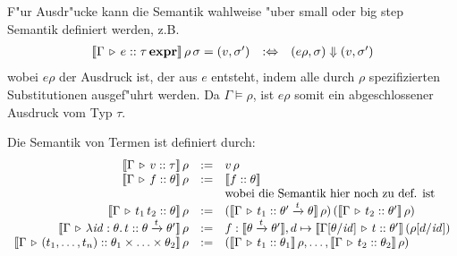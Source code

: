 \documentclass[12pt,a4paper,bigheadings]{scrartcl}
\newcommand{\semantic}[1]{\ensuremath{\llbracket#1\rrbracket}}
\newcommand{\bexpr}{\ensuremath{\mathbf{expr}}}
\newcommand{\etype}[1]{#1\,\bexpr}
\newcommand{\tto}{\ensuremath{\xrightarrow{t}}}
\begin{document}
\noindent
F"ur Ausdr"ucke kann die Semantik wahlweise "uber small oder big step Semantik definiert
werden, z.B.
\[\begin{array}{rcl}
  \semantic{\Tj{\Gamma}{e}{\etype{\tau}}}\,\rho\,\sigma = (v,\sigma')
  & :\Leftrightarrow &
  (e\rho,\sigma) \Downarrow (v,\sigma')
\end{array}\]
wobei $e \rho$ der Ausdruck ist, der aus $e$ entsteht, indem alle durch $\rho$ spezifizierten
Substitutionen ausgef"uhrt werden. Da $\Gamma \models \rho$, ist $e \rho$ somit ein abgeschlossener
Ausdruck vom Typ $\tau$.

\pagebreak[3] \noindent
Die Semantik von Termen ist definiert durch:
\[\begin{array}{rcl}
  \semantic{\Tj{\Gamma}{v}{\tau}}\,\rho
  & := &
  v\,\rho 
  \\
  \semantic{\Tj{\Gamma}{f}{\theta}}\,\rho
  & := &
  \semantic{\tj{f}{\theta}} \\
  && \text{wobei die Semantik hier noch zu def. ist}
  \\
  \semantic{\Tj{\Gamma}{\app{t_1}{t_2}}{\theta}}\,\rho
  & := &
  (\semantic{\Tj{\Gamma}{t_1}{\theta'\tto\theta}}\,\rho)\,(\semantic{\Tj{\Gamma}{t_2}{\theta'}}\,\rho)
  \\
  \semantic{\Tj{\Gamma}{\abstr{\id:\theta}{t}}{\theta\tto\theta'}}\,\rho
  & := &
  f: \semantic{\theta\tto\theta'},
  d \mapsto \semantic{\Tj{\Gamma[\theta/\id]}{t}{\theta'}}\,(\rho[d/\id])
  \\
  \semantic{\Tj{\Gamma}{(t_1,\ldots,t_n)}{\theta_1\times\ldots\times\theta_2}}\,\rho
  & := &
  (\semantic{\Tj{\Gamma}{t_1}{\theta_1}}\,\rho,\ldots,\semantic{\Tj{\Gamma}{t_2}{\theta_2}}\,\rho)
\end{array}\]
\end{document}

